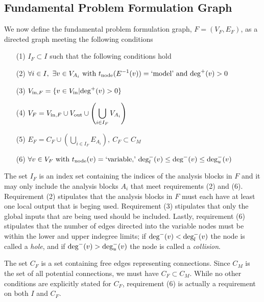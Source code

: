 \subsection{Fundamental Problem Formulation Graph}
We now define the fundamental problem formulation graph, $F=(V_F,E_F)$, as a directed graph meeting the following conditions
\begin{enumerate}
\item[(1)] $\displaystyle{I_F \subset I}$ such that the following conditions hold
\item[(2)] $\displaystyle{ \forall i \in I, \ \exists v \in V_{A_i} \textrm{ with } t_\textrm{node}(E^{-1}(v))=\textrm{`model'} \textrm{ and } \textrm{deg}^+(v)>0 }$
\item[(3)] $\displaystyle{V_{\textrm{in},F} = \{v \in V_\textrm{in} | \textrm{deg}^+(v) > 0\} }$
\item[(4)] $\displaystyle{V_F = V_{\textrm{in},F} \cup V_\textrm{out} \cup \left( \bigcup_{i \in I_F} V_{A_i} \right)}$
\item[(5)] $\displaystyle{E_F = C_F \cup \left( \bigcup_{i \in I_F} E_{A_i} \right), \ C_F \subset C_M}$
\item[(6)] $\displaystyle{\forall v \in V_F \textrm{ with } t_\textrm{node}(v) = \textrm{`variable,'} \  \textrm{deg}_l^-(v) \leq \textrm{deg}^-(v) \leq \textrm{deg}_u^-(v)}$
\end{enumerate}
The set $I_F$ is an index set containing the indices of the analysis blocks in $F$ and it may only include the analysis blocks $A_i$ that meet requirements (2) and (6). Requirement (2) stipulates that the analysis blocks in $F$ must each have at least one local output that is beging used. Requirement (3) stipulates that only the global inputs that are being used should be included. Lastly, requirement (6) stipulates that the number of edges directed into the variable nodes must be within the lower and upper indegree limits; if $\textrm{deg}^-(v) < \textrm{deg}_l^-(v)$ the node is called a \emph{hole}, and if $\textrm{deg}^-(v) > \textrm{deg}_u^-(v)$ the node is called a \emph{collision}. 

The set $C_F$ is a set containing free edges representing connections. Since $C_M$ is the set of all potential connections, we must have $C_F \subset C_M$. While no other conditions are explicitly stated for $C_F$, requirement (6) is actually a requirement on both $I$ and $C_F$.

